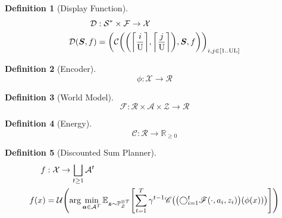 \documentclass{amsart}
\theoremstyle{definition}
\newtheorem{definition}{Definition}
\theoremstyle{remark}
\newcommand{\E}{\mathbb{E}}
\newcommand{\R}{\mathbb{R}}
\begin{document}
\begin{definition}[Display Function]
\begin{align*}
	\mathcal{D}
	&:
	\mathcal{S}^{*}
	\times
	\mathcal{F}
	\to
	\mathcal{X}
	\\
	\mathcal{D}(\bm{S},f)
	&=
	\mleft(
		\mathcal{C}\mleft(
			\mleft(
				\mleft\lceil\frac{i}{\mathrm{U}}\mright\rceil,
				\mleft\lceil\frac{j}{\mathrm{U}}\mright\rceil
			\mright),
			\bm{S},
			f
		\mright)
	\mright)_{i,j\in[1..\mathrm{U}\mathrm{L}]}
\end{align*}
\end{definition}

\begin{definition}[Encoder]
$$
	\phi:\mathcal{X}\to\mathcal{R}
$$
\end{definition}

\begin{definition}[World Model]
$$
	\mathscr{F}
	:
	\mathcal{R}\times\mathcal{A}\times\mathcal{Z}
	\to
	\mathcal{R}
$$
\end{definition}

\begin{definition}[Energy]
$$
	\mathscr{C}:\mathcal{R}\to\R_{\geq 0}
$$
\end{definition}

\begin{definition}[Discounted Sum Planner]
\begin{align*}
	f
	&:
	\mathcal{X}
	\to
	\bigsqcup_{t\geq 1}\mathcal{A}^{t}
	\\
	f(x)
	&=
	\mathcal{U}\mleft(
		\arg\min_{\bm{a}\in\mathcal{A}^{T}}
		\E_{\bm{z}\sim\mathbb{P}_{\mathcal{Z}}^{\otimes T}}\mleft[
			\sum_{t=1}^{T}
			\gamma^{t-1}
			\mathscr{C}\mleft(
				\mleft(
					\bigcirc_{i=1}^{t}
					\mathscr{F}\mleft(\cdot,a_{i},z_{i}\mright)
				\mright)(
					\phi(x)
				)
			\mright)
		\mright]
	\mright)
\end{align*}
\end{definition}


\end{document}
